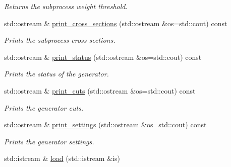 \begin{DoxyCompactItemize}
\begin{DoxyCompactList}\small\item\em Returns the subprocess weight threshold. \end{DoxyCompactList}\item 
\hypertarget{a00210_a600c6463d26cb42cfb01ad2a5fa81e8a}{std\-::ostream \& \hyperlink{a00210_a600c6463d26cb42cfb01ad2a5fa81e8a}{print\-\_\-cross\-\_\-sections} (std\-::ostream \&os=std\-::cout) const }\label{a00210_a600c6463d26cb42cfb01ad2a5fa81e8a}

\begin{DoxyCompactList}\small\item\em Prints the subprocess cross sections. \end{DoxyCompactList}\item 
\hypertarget{a00210_a7138ff23c58327dd958c5d261ab18421}{std\-::ostream \& \hyperlink{a00210_a7138ff23c58327dd958c5d261ab18421}{print\-\_\-status} (std\-::ostream \&os=std\-::cout) const }\label{a00210_a7138ff23c58327dd958c5d261ab18421}

\begin{DoxyCompactList}\small\item\em Prints the status of the generator. \end{DoxyCompactList}\item 
\hypertarget{a00210_abe047fb221ea9c4d0d4abaddd270b585}{std\-::ostream \& \hyperlink{a00210_abe047fb221ea9c4d0d4abaddd270b585}{print\-\_\-cuts} (std\-::ostream \&os=std\-::cout) const }\label{a00210_abe047fb221ea9c4d0d4abaddd270b585}

\begin{DoxyCompactList}\small\item\em Prints the generator cuts. \end{DoxyCompactList}\item 
\hypertarget{a00210_a497a6bcd40e63046684035f933e66146}{std\-::ostream \& \hyperlink{a00210_a497a6bcd40e63046684035f933e66146}{print\-\_\-settings} (std\-::ostream \&os=std\-::cout) const }\label{a00210_a497a6bcd40e63046684035f933e66146}

\begin{DoxyCompactList}\small\item\em Prints the generator settings. \end{DoxyCompactList}\item 
\hypertarget{a00210_a24f39c28eb3e370bee16d338a7f7fb1c}{std\-::istream \& \hyperlink{a00210_a24f39c28eb3e370bee16d338a7f7fb1c}{load} (std\-::istream \&is)}\label{a00210_a24f39c28eb3e370bee16d338a7f7fb1c}


\end{DoxyCompactItemize}
